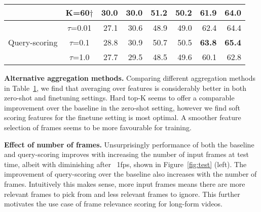 \begin{table}[t]
\begin{tabular}{@{}ccrrrrrr@{}}
& K=60$\dagger$                       & 30.0                   & 30.0                        &  51.2                     &  50.2                        &  61.9                         &  64.0                           \\ \midrule
\multirow{3}{*}{Query-scoring}                           & $\tau$=0.01                    &  27.1                  & 30.6                        & 48.9                          & 49.0                     & 62.4                           & 64.4                            \\
                                                                                   & $\tau$=0.1                      &  28.8                 & 30.9                        & 50.7                          & 50.5                      &  \textbf{63.8}                         & \textbf{65.4}                           \\
                                                                                   & $\tau$=1.0                      &  27.7                 & 29.5                        &  48.5                        &  49.6                      & 60.1                          &  62.8                           \\ \bottomrule
\end{tabular}
\label{tab:scoring_compare}
\end{table} \noindent\textbf{Alternative aggregation methods.} Comparing different aggregation methods in Table~\ref{tab:scoring_compare}, we find that averaging over features is considerably better in both zero-shot and finetuning settings. Hard top-K seems to offer a comparable improvement over the baseline in the zero-shot setting, however we find soft scoring features for the finetune setting is most optimal. A smoother feature selection of frames seems to be more favourable for training. 

\noindent\textbf{Effect of number of frames.}
Unsurprisingly performance of both the baseline and query-scoring improves with increasing the number of input frames at test time, albeit with diminishing after ~1fps, shown in Figure~\ref{fig:test} (left). The improvement of query-scoring over the baseline also increases with the number of frames. Intuitively this makes sense, more input frames means there are more relevant frames to pick from and less relevant frames to ignore. This further motivates the use case of frame relevance scoring for long-form videos.

